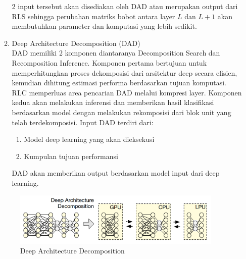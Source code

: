 \begin{enumerate}
\begin{enumerate}
\begin{enumerate}
		\end{enumerate}
		2 input tersebut akan disediakan oleh DAD atau merupakan output dari RLS sehingga perubahan matriks bobot antara layer $L$ dan $L+1$ akan membutuhkan parameter dan komputasi yang lebih sedikit.
		\item Deep Architecture Decomposition (DAD)\\
		DAD memiliki 2 komponen diantaranya Decomposition Search dan Recomposition Inference. Komponen pertama bertujuan untuk memperhitungkan proses dekomposisi dari arsitektur deep secara efisien, kemudian dihitung estimasi performa berdasarkan tujuan komputasi. RLC memperluas area pencarian DAD melalui kompresi layer. Komponen kedua akan melakukan inferensi dan memberikan hasil klasifikasi berdasarkan model dengan melakukan rekomposisi dari blok unit yang telah terdekomposisi. Input DAD terdiri dari:
		\begin{enumerate}
			\item Model deep learning yang akan dieksekusi
			\item Kumpulan tujuan performansi
		\end{enumerate}
		DAD akan memberikan output berdasarkan model input dari deep learning.		
	\end{enumerate}
\begin{figure}[htp]
	\centering
	\includegraphics[width=10cm]{pics/dad}
	\caption{Deep Architecture Decomposition}
	\label{fig:dad}
\end{figure}
\end{enumerate}

